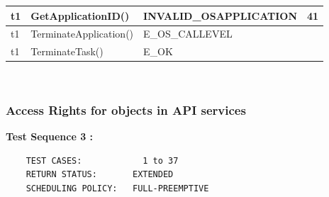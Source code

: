 \documentclass[10pt]{article}
\newlength{\Li}\settowidth{\Li}{Running}
\newlength{\Lii}\setlength{\Lii}{7cm}
\newlength{\Liiii}\setlength{\Liiii}{0.9cm}
\newlength{\Liii}\setlength{\Liii}{\textwidth} \addtolength{\Liii}{-\Li} \addtolength{\Liii}{-\Lii} \addtolength{\Liii}{-\Liiii}
\begin{document}
	\begin{supertabular}{|p{\Li}|p{\Lii}|p{\Liii}|p{\Liiii}|} \hline 
	t1		& GetApplicationID()									& INVALID\_OSAPPLICATION								& 41 \\ \hline
	t1		& TerminateApplication()								& E\_OS\_CALLEVEL									& \\ \hline
	t1 		& TerminateTask()									& E\_OK												& \\ \hline 
	\end{supertabular}\\
	
	\subsubsection{Access Rights for objects in API services}

	\textbf{Test Sequence 3 :}
	\begin{lstlisting}
	TEST CASES:		       1 to 37
	RETURN STATUS:	  	 EXTENDED
	SCHEDULING POLICY:   FULL-PREEMPTIVE
	\end{lstlisting}
	
\end{document}

